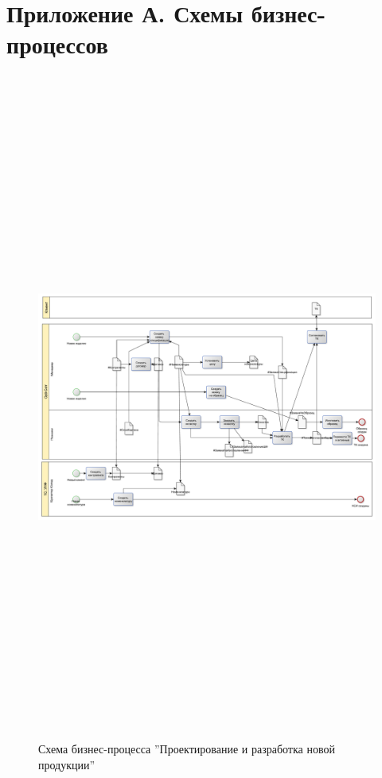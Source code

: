 
\newpage
\section{Приложение А. Схемы бизнес-процессов}


\begin{figure}[!htb]
\centering
  \includegraphics[width=200mm, height=220mm, angle=90, keepaspectratio]{50_Pics/1_NewGoods.pdf}
\caption{Схема бизнес-процесса ''Проектирование и разработка новой продукции''}
\label{pic:1_Newgoods}
\end{figure} 

\clearpage



